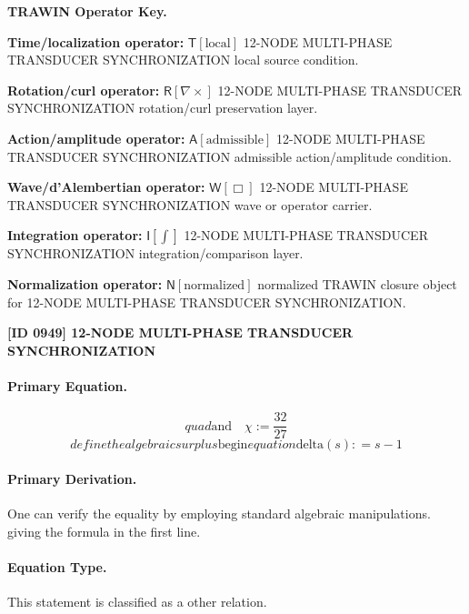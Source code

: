 \par\vspace{0.45\baselineskip}
\noindent\begin{minipage}[t]{\linewidth}
\begingroup
\small
\raggedright
\textbf{TRAWIN Operator Key.}\par
\noindent\textbf{Time/localization operator:} $\mathsf{T}\!\left[\mathrm{local}\right]$ 12-NODE MULTI-PHASE TRANSDUCER SYNCHRONIZATION local source condition.\par
\noindent\textbf{Rotation/curl operator:} $\mathsf{R}\!\left[\nabla\times\right]$ 12-NODE MULTI-PHASE TRANSDUCER SYNCHRONIZATION rotation/curl preservation layer.\par
\noindent\textbf{Action/amplitude operator:} $\mathsf{A}\!\left[\mathrm{admissible}\right]$ 12-NODE MULTI-PHASE TRANSDUCER SYNCHRONIZATION admissible action/amplitude condition.\par
\noindent\textbf{Wave/d'Alembertian operator:} $\mathsf{W}\!\left[\Box\right]$ 12-NODE MULTI-PHASE TRANSDUCER SYNCHRONIZATION wave or operator carrier.\par
\noindent\textbf{Integration operator:} $\mathsf{I}\!\left[\int\right]$ 12-NODE MULTI-PHASE TRANSDUCER SYNCHRONIZATION integration/comparison layer.\par
\noindent\textbf{Normalization operator:} $\mathsf{N}\!\left[\mathrm{normalized}\right]$ normalized TRAWIN closure object for 12-NODE MULTI-PHASE TRANSDUCER SYNCHRONIZATION.\par
\endgroup
\end{minipage}

\clearpage
\noindent\textbf{[ID 0949] 12-NODE MULTI-PHASE TRANSDUCER SYNCHRONIZATION}\par
\vspace{0.35em}
\paragraph{Primary Equation.}
\[
quad \text{and}\quad \chi := \frac{32}{27}
\]
\[
define the algebraic surplus \mathrm{begin}{equation} \mathrm{delta}(s) : =s-1
\]

\paragraph{Primary Derivation.}
One can verify the equality by employing standard algebraic manipulations. giving the formula in the first line.
\paragraph{Equation Type.}
This statement is classified as a other relation.

